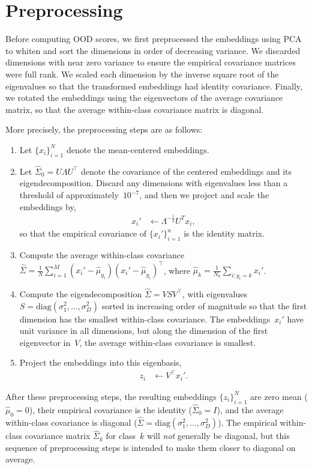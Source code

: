 \section{Preprocessing}
\label{app:preprocessing}

Before computing OOD scores, we first preprocessed the embeddings using PCA to
whiten and sort the dimensions in order of decreasing variance. We discarded
dimensions with near zero variance to ensure the empirical covariance matrices
were full rank. We scaled each dimension by the inverse square root of the
eigenvalues so that the transformed embeddings had identity covariance.
Finally, we rotated the embeddings using the eigenvectors of the average
covariance matrix, so that the average within-class covariance matrix is
diagonal.

More precisely, the preprocessing steps are as follows:
\begin{enumerate}
    \item Let $\{x_i\}_{i=1}^N$ denote the mean-centered embeddings.

    \item Let $\hat{\Sigma}_0 = U \Lambda U^\top$ denote the covariance of the
      centered embeddings and its eigendecomposition. Discard any dimensions
      with eigenvalues less than a threshold of approximately~$10^{-7}$, and
      then we project and scale the embeddings by,
    \begin{align}
        x_i' &\leftarrow \Lambda^{-\frac{1}{2}} U^T x_i,
    \end{align}
    so that the empirical covariance of $\{x_i'\}_{i=1}^n$ is the identity matrix.

    \item Compute the average within-class covariance $\hat{\Sigma} = \frac{1}{N} \sum_{i=1}^M (x_i' - \hat{\mu}_{y_i})(x_i' - \hat{\mu}_{y_i})^\top$, where $\hat{\mu}_k = \frac{1}{N_k} \sum_{i:y_i=k} x_i'$.

    \item Compute the eigendecomposition $\hat{\Sigma} = V S V^\top$, with
      eigenvalues $S = \mathrm{diag}(\sigma_1^2, \ldots, \sigma_D^2)$ sorted in
      increasing order of magnitude so that the first dimension has the
      smallest within-class covariance. The embeddings~$x_i'$ have unit
      variance in all dimensions, but along the dimension of the first
      eigenvector in~$V$, the average within-class covariance is smallest.

    \item Project the embeddings into this eigenbasis,
    \begin{align}
        z_i &\leftarrow V^\top x_i'.
    \end{align}
\end{enumerate}
After these preprocessing steps, the resulting embeddings $\{z_i\}_{i=1}^N$ are
zero mean ($\hat{\mu}_0=0$), their empirical covariance is the identity
($\hat{\Sigma}_0=I$), and the average within-class covariance is diagonal
($\hat{\Sigma}=\mathrm{diag}(\sigma_1^2, \ldots, \sigma_D^2)$). The empirical
within-class covariance matrix $\hat{\Sigma}_k$ for class~$k$ will \emph{not}
generally be diagonal, but this sequence of preprocessing steps is intended to
make them closer to diagonal on average.

